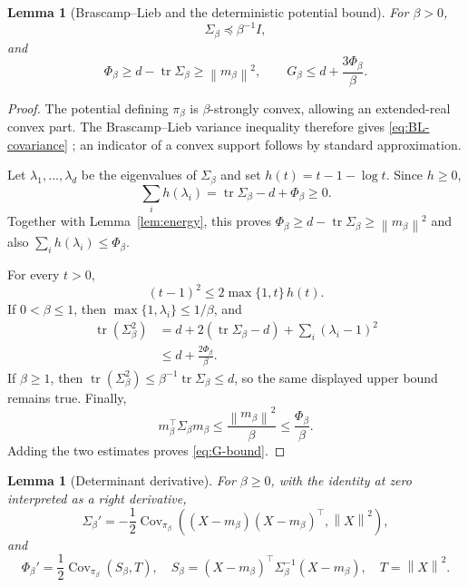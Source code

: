 \documentclass[11pt]{article}
\newtheorem{lemma}[theorem]{Lemma}
\theoremstyle{remark}
\newcommand{\1}{\bm 1}
\newcommand{\Cov}{\operatorname{Cov}}
\newcommand{\tr}{\operatorname{tr}}
\newcommand{\norm}[1]{\left\lVert #1\right\rVert}
\begin{document}
\begin{lemma}[Brascamp--Lieb and the deterministic potential bound]
\label{lem:deterministic-G}
For $\beta>0$,
\begin{equation}\label{eq:BL-covariance}
  \Sigma_\beta\preceq\beta^{-1}I,
\end{equation}
and
\begin{equation}\label{eq:G-bound}
  \Phi_\beta\geq d-\tr\Sigma_\beta\geq\norm{m_\beta}^2,
  \qquad
  G_\beta\leq d+\frac{3\Phi_\beta}{\beta}.
\end{equation}
\end{lemma}

\begin{proof}
The potential defining $\pi_\beta$ is $\beta$-strongly convex, allowing
an extended-real convex part.  The Brascamp--Lieb variance inequality
therefore gives \eqref{eq:BL-covariance}
\citep{BrascampLieb76}; an indicator of a convex support follows by
standard approximation.

Let $\lambda_1,\ldots,\lambda_d$ be the eigenvalues of $\Sigma_\beta$
and set $h(t)=t-1-\log t$.  Since $h\geq0$,
\[
  \sum_i h(\lambda_i)
  =\tr\Sigma_\beta-d+\Phi_\beta\geq0.
\]
Together with Lemma~\ref{lem:energy}, this proves
$\Phi_\beta\geq d-\tr\Sigma_\beta\geq\norm{m_\beta}^2$ and also
$\sum_i h(\lambda_i)\leq\Phi_\beta$.

For every $t>0$,
\begin{equation}\label{eq:scalar-entropy}
  (t-1)^2\leq2\max\{1,t\}\,h(t).
\end{equation}
If $0<\beta\leq1$, then
$\max\{1,\lambda_i\}\leq1/\beta$, and
\begin{align*}
  \tr(\Sigma_\beta^2)
  &=d+2(\tr\Sigma_\beta-d)+\sum_i(\lambda_i-1)^2\\
  &\leq d+\frac{2\Phi_\beta}{\beta}.
\end{align*}
If $\beta\geq1$, then
$\tr(\Sigma_\beta^2)\leq\beta^{-1}\tr\Sigma_\beta\leq d$, so the
same displayed upper bound remains true.  Finally,
\[
  m_\beta^\top\Sigma_\beta m_\beta
  \leq\frac{\norm{m_\beta}^2}{\beta}
  \leq\frac{\Phi_\beta}{\beta}.
\]
Adding the two estimates proves \eqref{eq:G-bound}.
\end{proof}

\begin{lemma}[Determinant derivative]
\label{lem:Phi-derivative}
For $\beta\geq0$, with the identity at zero interpreted as a right
derivative,
\begin{equation}\label{eq:Sigma-derivative}
  \Sigma_\beta'
  =-\frac12\Cov_{\pi_\beta}\!\left(
     (X-m_\beta)(X-m_\beta)^\top,\norm X^2
  \right),
\end{equation}
and
\begin{equation}\label{eq:Phi-derivative}
  \Phi_\beta'
  =\frac12\Cov_{\pi_\beta}\!\left(S_\beta,T\right),
  \quad
  S_\beta=(X-m_\beta)^\top\Sigma_\beta^{-1}(X-m_\beta),
  \quad T=\norm X^2.
\end{equation}
\end{lemma}
\end{document}
